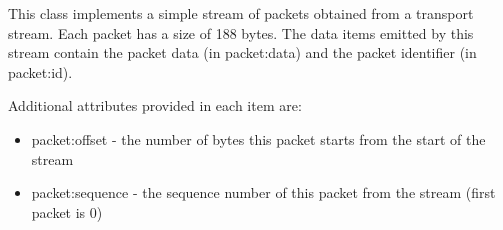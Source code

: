 \label{sec:stream.io.TransportStream}

This class implements a simple stream of packets obtained from a transport
stream. Each packet has a size of 188 bytes. The data items emitted by this
stream contain the packet data (in {\ttfamily packet:data}) and the packet
identifier (in {\ttfamily packet:id}).

Additional attributes provided in each item are:
\begin{itemize}
  \item {\ttfamily packet:offset} - the number of bytes this packet starts from the start of the stream
  \item {\ttfamily packet:sequence} - the sequence number of this packet from the stream (first packet is $0$)
\end{itemize}